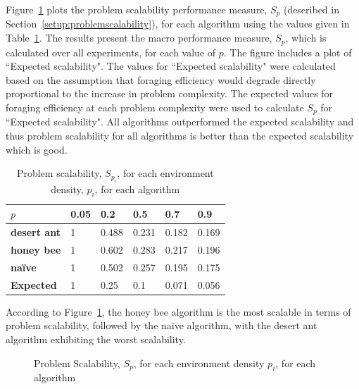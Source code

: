\documentclass[preprint,12pt]{elsarticle}
\begin{document}
Figure~\ref{fig:problemscalability} plots the problem scalability performance measure, $S_p$ (described in Section~\ref{setup:problemscalability}), for each algorithm using the values given in Table~\ref{table:problemscalability}. The results present the macro performance measure, $S_p$, which is calculated over all experiments, for each value of $p$. The figure includes a plot of ``Expected scalability". The values for ``Expected scalability" were calculated based on the assumption that foraging efficiency would degrade directly proportional to the increase in problem complexity. The expected values for foraging efficiency at each problem complexity were used to calculate $S_p$ for ``Expected scalability". All algorithms outperformed the expected scalability and thus problem scalability for all algorithms is better than the expected scalability which is good. 


\begin{table}[!htbp]
    \centering
    \caption{Problem scalability, $S_{p_i}$, for each environment density, $p_i$, for each algorithm}
    \label{table:problemscalability}
    \begin{tabular}{@{}llllll@{}}
    \toprule
    \textbf{$p$}                  & \textbf{0.05} & \textbf{0.2        } & \textbf{0.5}         & \textbf{0.7}         & \textbf{0.9}         \\ \midrule
    \textbf{desert ant}           & 1    & 0.488 & 0.231 & 0.182 & 0.169 \\
    \textbf{honey bee}            & 1    & 0.602 & 0.283 & 0.217 & 0.196 \\
    \textbf{na\"ive}              & 1    & 0.502 & 0.257 & 0.195 & 0.175 \\
    \textbf{Expected} & 1    & 0.25        & 0.1         & 0.071 & 0.056 \\ \bottomrule
    \end{tabular}
\end{table}

According to Figure~\ref{fig:problemscalability}, the honey bee algorithm is the most scalable in terms of problem scalability, followed by the na\"ive algorithm, with the desert ant algorithm exhibiting the worst scalability.


\begin{figure}[htb]
    \centering
    \resizebox{\textwidth}{!}{}
    \caption{Problem Scalability, $S_p$, for each environment density $p_i$, for each algorithm}
    \label{fig:problemscalability}
\end{figure}
    
\end{document}
